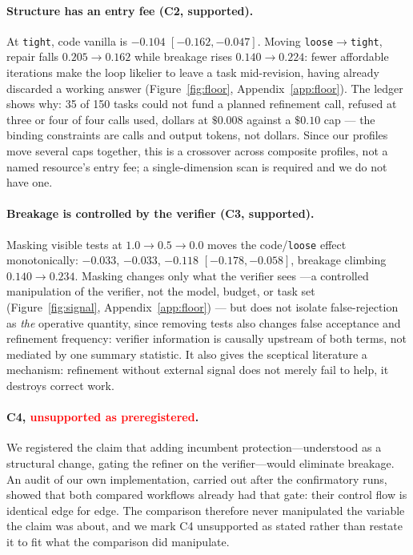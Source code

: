 \documentclass{article}
\begin{document}
\paragraph{Structure has an entry fee (C2, supported).} At \texttt{tight}, code
vanilla is $-0.104$ $[-0.162,-0.047]$. Moving \texttt{loose}$\to$\texttt{tight},
repair falls $0.205\to0.162$ while breakage rises $0.140\to0.224$: fewer
affordable iterations make the loop likelier to leave a task mid-revision,
having already discarded a working answer (Figure~\ref{fig:floor},
Appendix~\ref{app:floor}). The ledger shows why: 35 of 150 tasks could not fund
a planned refinement call, refused at three or four of four calls used, dollars
at $\$0.008$ against a $\$0.10$ cap --- the binding constraints are calls and
output tokens, not dollars. Since our profiles move several caps together,
this is a crossover across composite profiles, not a named resource's entry
fee; a single-dimension scan is required and we do not have one.

\paragraph{Breakage is controlled by the verifier (C3, supported).} Masking
visible tests at $1.0 \to 0.5 \to 0.0$ moves the code/\texttt{loose} effect
monotonically: $-0.033$, $-0.033$, $-0.118$ $[-0.178,-0.058]$, breakage
climbing $0.140\to0.234$. Masking changes only what the verifier sees ---a
controlled manipulation of the verifier, not the model, budget, or task set
(Figure~\ref{fig:signal}, Appendix~\ref{app:floor}) --- but does not isolate
false-rejection as \emph{the} operative quantity, since removing tests also
changes false acceptance and refinement frequency: verifier information is
causally upstream of both terms, not mediated by one summary statistic. It
also gives the sceptical literature a mechanism: refinement without external
signal does not merely fail to help, it destroys correct work.

\paragraph{C4, \textcolor{red}{unsupported as preregistered}.} We registered
the claim that adding incumbent protection---understood as a structural change,
gating the refiner on the verifier---would eliminate breakage. An audit of our
own implementation, carried out after the confirmatory runs, showed that both
compared workflows already had that gate: their control flow is identical edge
for edge. The comparison therefore never manipulated the variable the claim was
about, and we mark C4 unsupported as stated rather than restate it to fit what
the comparison did manipulate.
\end{document}
